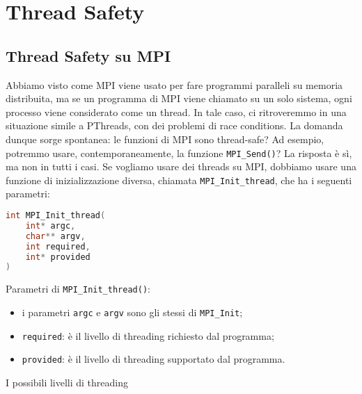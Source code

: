 \section{Thread Safety}

\subsection{Thread Safety su MPI}

Abbiamo visto come MPI viene usato per fare programmi paralleli su memoria distribuita, ma se un programma di MPI viene chiamato su un solo sistema, ogni processo viene considerato come un thread. In tale caso, ci ritroveremmo in una situazione simile a PThreads, con dei problemi di race conditions. La domanda dunque sorge spontanea: le funzioni di MPI sono thread-safe? Ad esempio, potremmo usare, contemporaneamente, la funzione \verb|MPI_Send()|?
\nwl
La risposta è sì, ma non in tutti i casi. Se vogliamo usare dei threads su MPI, dobbiamo usare una funzione di inizializzazione diversa, chiamata \verb|MPI_Init_thread|, che ha i seguenti parametri:
\begin{codedefine}
    \begin{lstlisting}[language = C, numbers = none]
int MPI_Init_thread(
    int* argc,
    char** argv,
    int required,
    int* provided
)\end{lstlisting}
    \tcblower
    Parametri di \verb|MPI_Init_thread()|:
    \begin{itemize}
        \item i parametri \verb|argc| e \verb|argv| sono gli stessi di \verb|MPI_Init|;
        \item \verb|required|: è il livello di threading richiesto dal programma;
        \item \verb|provided|: è il livello di threading supportato dal programma.
    \end{itemize}
\end{codedefine}

I possibili livelli di threading 